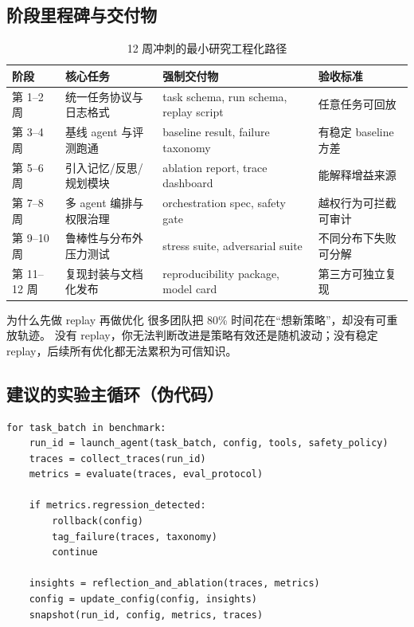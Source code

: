 \documentclass[a4paper]{article}
\begin{document}
\subsection{阶段里程碑与交付物}
\begin{table}[H]
\centering
\begin{tabular}{p{2.2cm}p{3.5cm}p{3.6cm}p{3.2cm}}
\toprule
\textbf{阶段} & \textbf{核心任务} & \textbf{强制交付物} & \textbf{验收标准} \\
\midrule
第 1--2 周 & 统一任务协议与日志格式 & task schema, run schema, replay script & 任意任务可回放 \\
第 3--4 周 & 基线 agent 与评测跑通 & baseline result, failure taxonomy & 有稳定 baseline 方差 \\
第 5--6 周 & 引入记忆/反思/规划模块 & ablation report, trace dashboard & 能解释增益来源 \\
第 7--8 周 & 多 agent 编排与权限治理 & orchestration spec, safety gate & 越权行为可拦截可审计 \\
第 9--10 周 & 鲁棒性与分布外压力测试 & stress suite, adversarial suite & 不同分布下失败可分解 \\
第 11--12 周 & 复现封装与文档化发布 & reproducibility package, model card & 第三方可独立复现 \\
\bottomrule
\end{tabular}
\caption{12 周冲刺的最小研究工程化路径}
\end{table}

\begin{knowledgebox}{为什么先做 replay 再做优化}
很多团队把 80\% 时间花在“想新策略”，却没有可重放轨迹。  
没有 replay，你无法判断改进是策略有效还是随机波动；没有稳定 replay，后续所有优化都无法累积为可信知识。
\end{knowledgebox}

\subsection{建议的实验主循环（伪代码）}
\begin{lstlisting}[caption={Research Loop: 可复现 Agent 迭代主循环},label={lst:research-loop}]
for task_batch in benchmark:
    run_id = launch_agent(task_batch, config, tools, safety_policy)
    traces = collect_traces(run_id)
    metrics = evaluate(traces, eval_protocol)

    if metrics.regression_detected:
        rollback(config)
        tag_failure(traces, taxonomy)
        continue

    insights = reflection_and_ablation(traces, metrics)
    config = update_config(config, insights)
    snapshot(run_id, config, metrics, traces)
\end{lstlisting}
\end{document}
